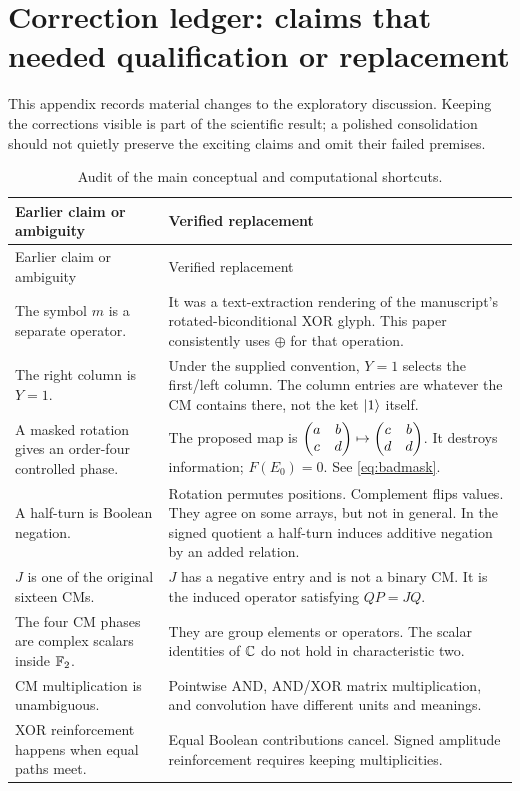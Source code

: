 \section{Correction ledger: claims that needed qualification or replacement}\label{app:audit}
This appendix records material changes to the exploratory discussion. Keeping the corrections visible is part of the scientific result; a polished consolidation should not quietly preserve the exciting claims and omit their failed premises.

\begingroup\small
\begin{longtable}{@{}L{0.31\textwidth}L{0.62\textwidth}@{}}
\caption{Audit of the main conceptual and computational shortcuts.}\\
\toprule
Earlier claim or ambiguity & Verified replacement\\
\midrule\endfirsthead
\toprule Earlier claim or ambiguity & Verified replacement\\\midrule\endhead
The symbol $m$ is a separate operator. & It was a text-extraction rendering of the manuscript's rotated-biconditional XOR glyph. This paper consistently uses $\oplus$ for that operation.\\
The right column is $Y=1$. & Under the supplied convention, $Y=1$ selects the first/left column. The column entries are whatever the CM contains there, not the ket $\lvert 1\rangle$ itself.\\
A masked rotation gives an order-four controlled phase. & The proposed map is $\begin{pmatrix}a&b\\c&d\end{pmatrix}\mapsto\begin{pmatrix}c&b\\d&d\end{pmatrix}$. It destroys information; $F(E_0)=0$. See \cref{eq:badmask}.\\
A half-turn is Boolean negation. & Rotation permutes positions. Complement flips values. They agree on some arrays, but not in general. In the signed quotient a half-turn induces additive negation by an added relation.\\
$J$ is one of the original sixteen CMs. & $J$ has a negative entry and is not a binary CM. It is the induced operator satisfying $QP=JQ$.\\
The four CM phases are complex scalars inside $\mathbb F_2$. & They are group elements or operators. The scalar identities of $\mathbb C$ do not hold in characteristic two.\\
CM multiplication is unambiguous. & Pointwise AND, AND/XOR matrix multiplication, and convolution have different units and meanings.\\
XOR reinforcement happens when equal paths meet. & Equal Boolean contributions cancel. Signed amplitude reinforcement requires keeping multiplicities.\\

\end{longtable}
